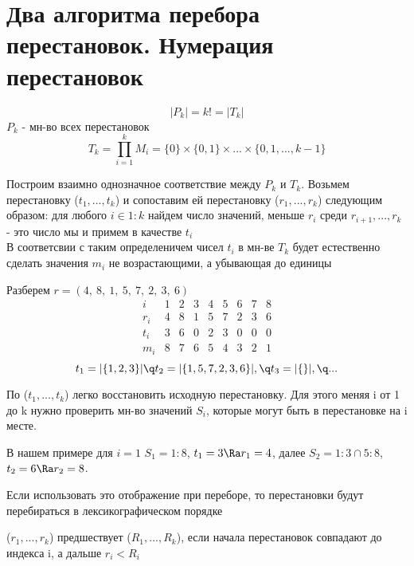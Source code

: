 \documentclass[discrete.tex]{subfiles}
\begin{document}
  \section{Два алгоритма перебора перестановок. Нумерация перестановок}

  \[|P_k| = k! = |T_k|\]
  $P_k$ - мн-во всех перестановок\\
  \[T_k = \prod_{i=1}^k M_i =\{0\} \times \{0,1\} \times ... \times \{0,1,...,k-1\}\]

  Построим взаимно однозначное соответствие между $P_k$ и $T_k$. Возьмем перестановку ($t_1,...,t_k$) и сопоставим ей перестановку ($r_1,...,r_k$) следующим образом: для любого $i \in 1:k$ найдем число значений, меньше $r_i$ среди $r_{i+1},...,r_k$ - это число мы и примем в качестве $t_i$\\

  В соответсвии с таким определеничем чисел $t_i$ в мн-ве $T_k$ будет естественно сделать значения $m_i$ не возрастающими, а убывающая до единицы

  Разберем $r = (4,\ 8,\ 1,\ 5,\ 7,\ 2,\ 3,\ 6)$
  \[\begin{matrix}
    i & 1 & 2 & 3 & 4 & 5 & 6 & 7 & 8\\
    r_i & 4 & 8 & 1 & 5 & 7 & 2 & 3 & 6\\
    t_i & 3 & 6 & 0 & 2 & 3 & 0 & 0 & 0\\
    m_i & 8 & 7 & 6 & 5 & 4 & 3 & 2 & 1
  \end{matrix}\]
  \[t_1 = |\{1,2,3\}| \q t_2 = |\{1,5,7,2,3,6\}|, \q t_3 = |\{\}|,\q ...\]

  По ($t_1,...,t_k$) легко восстановить исходную перестановку. Для этого меняя i от 1 до k нужно проверить мн-во значений $S_i$, которые могут быть в перестановке на i месте.

  В нашем примере для $i=1$ $S_1 = 1:8$, $t_1 = 3 \Ra r_1 = 4$, далее $S_2 = 1:3 \cap 5:8$, $t_2 = 6 \Ra r_2 = 8$.

  \begin{remark}
    Если использовать это отображение при переборе, то перестановки будут перебираться в лексикографическом порядке
  \end{remark}
  
  \begin{definition}
    ($r_1,...,r_k$) предшествует ($R_1,...,R_k$), если начала перестановок совпадают до индекса i, а дальше $r_i < R_i$\\
  \end{definition}
\end{document}

